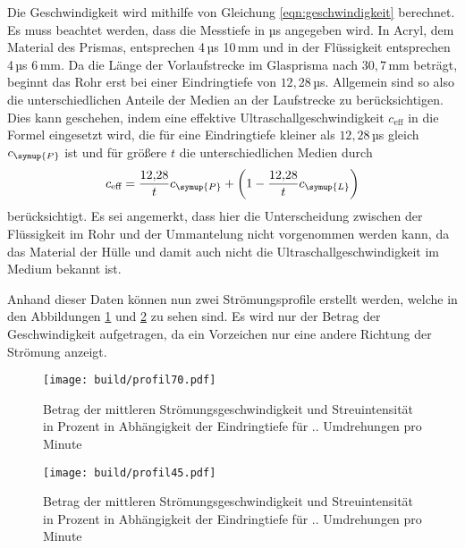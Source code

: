 Die Geschwindigkeit wird mithilfe von Gleichung \eqref{eqn:geschwindigkeit} berechnet.
Es muss beachtet werden, dass die Messtiefe in µs angegeben wird. In Acryl, dem Material
des Prismas, entsprechen 4\,µs 10\,mm und in der Flüssigkeit entsprechen 4\,µs 6\,mm.
Da die Länge der Vorlaufstrecke im Glasprisma nach \cite{Versuchsanleitung} $30{,}7$\,mm
beträgt, beginnt das Rohr erst bei einer Eindringtiefe von $12{,}$28\,µs. Allgemein
sind so also die unterschiedlichen Anteile der Medien an der Laufstrecke zu berücksichtigen.
Dies kann geschehen, indem eine effektive Ultraschallgeschwindigkeit $c_\text{eff}$ in die Formel
eingesetzt wird, die für eine Eindringtiefe kleiner als $12{,}28$\,µs gleich $c_{\symup{P}}$
ist und für größere $t$ die unterschiedlichen Medien durch
\begin{equation}
  c_\text{eff} = \frac{12{,}28}{t} c_{\symup{P}} + \left(1-\frac{12{,}28}{t} c_{\symup{L}} \right)
\end{equation}
berücksichtigt. Es sei angemerkt, dass hier die Unterscheidung zwischen der Flüssigkeit im Rohr
und der Ummantelung nicht vorgenommen werden kann, da das Material der Hülle und damit auch nicht die
Ultraschallgeschwindigkeit im Medium bekannt ist.

Anhand dieser Daten können nun zwei Strömungsprofile erstellt werden, welche in den
Abbildungen \ref{fig:profil70} und \ref{fig:profil45} zu sehen sind. Es wird nur
der Betrag der Geschwindigkeit aufgetragen, da ein Vorzeichen nur eine andere Richtung der
Strömung anzeigt.


\begin{figure}
  \centering
  \texttt{[image: build/profil70.pdf]}
  \caption{Betrag der mittleren Strömungsgeschwindigkeit und Streuintensität in Prozent
  in Abhängigkeit der Eindringtiefe für .. Umdrehungen pro Minute}
  \label{fig:profil70}
\end{figure}

\begin{figure}
  \centering
  \texttt{[image: build/profil45.pdf]}
  \caption{Betrag der mittleren Strömungsgeschwindigkeit und Streuintensität in Prozent
  in Abhängigkeit der Eindringtiefe für .. Umdrehungen pro Minute}
  \label{fig:profil45}
\end{figure}
